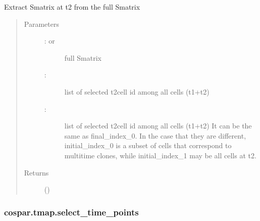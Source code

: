 \documentclass[letterpaper,10pt,english]{sphinxmanual}
\begin{document}
\begin{fulllineitems}
\label{\detokenize{cospar.tmap.generate_final_similarity:cospar.tmap.generate_final_similarity}}
Extract Smatrix at t2 from the full Smatrix
\begin{quote}\begin{description}
\item[{Parameters}] \leavevmode\begin{description}
\item[{ :  or }] \leavevmode
full Smatrix

\item[{ : }] \leavevmode
list of selected t2\sphinxhyphen{}cell id among all cells (t1+t2)

\item[{ : }] \leavevmode
list of selected t2\sphinxhyphen{}cell id among all cells (t1+t2)
It can be the same as final\_index\_0. In the case that they are different,
initial\_index\_0 is a subset of cells that correspond to multi\sphinxhyphen{}time clones,
while initial\_index\_1 may be all cells at t2.

\end{description}

\item[{Returns}] \leavevmode
{} ()

\end{description}\end{quote}

\end{fulllineitems}



\subsubsection{cospar.tmap.select\_time\_points}
\label{\detokenize{cospar.tmap.select_time_points:cospar-tmap-select-time-points}}\label{\detokenize{cospar.tmap.select_time_points::doc}}
\end{document}
